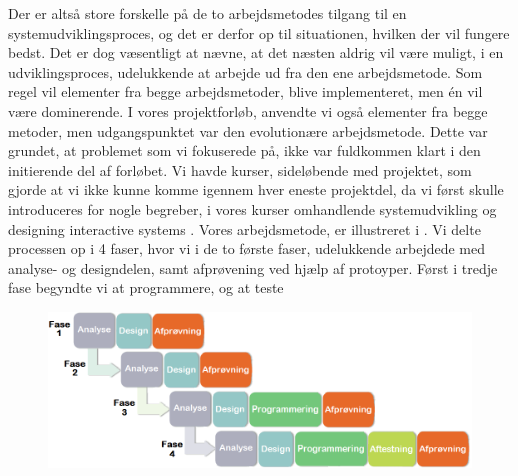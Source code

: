 Der er altså store forskelle på de to arbejdsmetodes tilgang til en systemudviklingsproces, og det er derfor op til situationen, hvilken der vil fungere bedst. Det er dog væsentligt at nævne, at det næsten aldrig vil være muligt, i en udviklingsproces, udelukkende at arbejde ud fra den ene arbejdsmetode. Som regel vil elementer fra begge arbejdsmetoder, blive implementeret, men én vil være dominerende. I vores projektforløb, anvendte vi også elementer fra begge metoder, men udgangspunktet var den evolutionære arbejdsmetode. Dette var grundet, at problemet som vi fokuserede på, ikke var fuldkommen klart i den initierende del af forløbet. Vi havde kurser, sideløbende med projektet, som gjorde at vi ikke kunne komme igennem hver eneste projektdel, da vi først skulle introduceres for nogle begreber, i vores kurser omhandlende systemudvikling \cite{ooad} og designing interactive systems \cite{deb}. Vores arbejdsmetode, er illustreret i . Vi delte processen op i 4 faser, hvor vi i de to første faser, udelukkende arbejdede med analyse- og designdelen, samt afprøvening ved hjælp af protoyper. Først i tredje fase begyndte vi at programmere, og at teste 

\begin{figure}[h]
		\centering
		\includegraphics[scale=0.5]{billeder/blandingsmetode.png}
  		\label{fig:blandingsmetode}
\end{figure}




